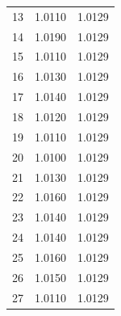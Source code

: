 \begin{table}[H]
\begin{threeparttable}
\begin{tabular}{l c r}
			13              & 1.0110                                                   & 1.0129                                                  \\
			14              & 1.0190                                                   & 1.0129                                                  \\
			15              & 1.0110                                                   & 1.0129                                                  \\
			16              & 1.0130                                                   & 1.0129                                                  \\
			17              & 1.0140                                                   & 1.0129                                                  \\
			18              & 1.0120                                                   & 1.0129                                                  \\
			19              & 1.0110                                                   & 1.0129                                                  \\
			20              & 1.0100                                                   & 1.0129                                                  \\
			21              & 1.0130                                                   & 1.0129                                                  \\
			22              & 1.0160                                                   & 1.0129                                                  \\
			23              & 1.0140                                                   & 1.0129                                                  \\
			24              & 1.0140                                                   & 1.0129                                                  \\
			25              & 1.0160                                                   & 1.0129                                                  \\
			26              & 1.0150                                                   & 1.0129                                                  \\
			27              & 1.0110                                                   & 1.0129                                                  \\

\end{tabular}
\end{threeparttable}
\end{table}
